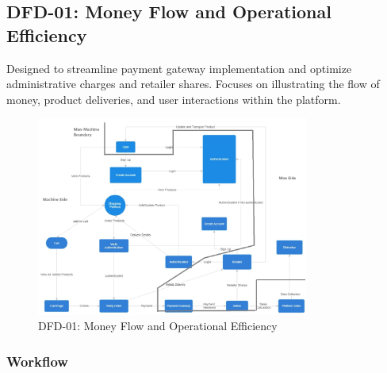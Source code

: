 \documentclass[a4paper,12pt]{article}
\begin{document}
\subsection{DFD-01: Money Flow and Operational Efficiency}
Designed to streamline payment gateway implementation and optimize administrative charges and retailer shares. Focuses on illustrating the flow of money, product deliveries, and user interactions within the platform.

\begin{figure}
    \centering
    \includegraphics[width=0.8\textwidth]{dfd1.jpg}
    \caption{DFD-01: Money Flow and Operational Efficiency}
\end{figure}

\subsubsection{Workflow}
\end{document}
